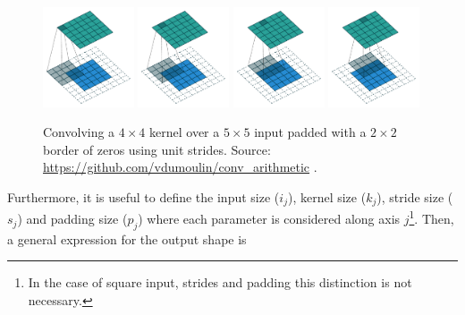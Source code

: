 \begin{itemize}
    \begin{figure}
        \centering
        \includegraphics[width=0.24\textwidth]{Images/Background/Convolution/arbitrary_padding_no_strides_00.pdf}
        \includegraphics[width=0.24\textwidth]{Images/Background/Convolution/arbitrary_padding_no_strides_01.pdf}
        \includegraphics[width=0.24\textwidth]{Images/Background/Convolution/arbitrary_padding_no_strides_02.pdf}
        \includegraphics[width=0.24\textwidth]{Images/Background/Convolution/arbitrary_padding_no_strides_03.pdf}
        \caption[Unit strides and zero padding convolution]{Convolving a $4 \times 4$ kernel over a $5 \times 5$ input padded with a $2 \times 2$ border of zeros using unit strides. Source: \url{https://github.com/vdumoulin/conv_arithmetic} \cite{trans-conv}.}
        \label{fig:arbitrary_padding_no_strides}
    \end{figure}

    Furthermore, it is useful to define the input size ($i_j$), kernel size ($k_j$), stride size ($s_j$) and padding size ($p_j$) where each parameter is considered along axis $j$\footnote{In the case of square input, strides and padding this distinction is not necessary.}. Then, a general expression \cite{trans-conv} for the output shape is
    

\end{itemize}
